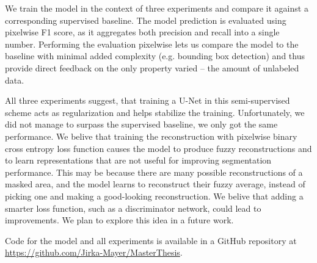 We train the model in the context of three experiments and compare it against a corresponding supervised baseline. The model prediction is evaluated using pixelwise F1 score, as it aggregates both precision and recall into a single number. Performing the evaluation pixelwise lets us compare the model to the baseline with minimal added complexity (e.g. bounding box detection) and thus provide direct feedback on the only property varied -- the amount of unlabeled data.

All three experiments suggest, that training a U-Net in this semi-supervised scheme acts as regularization and helps stabilize the training. Unfortunately, we did not manage to surpass the supervised baseline, we only got the same performance. We belive that training the reconstruction with pixelwise binary cross entropy loss function causes the model to produce fuzzy reconstructions and to learn representations that are not useful for improving segmentation performance. This may be because there are many possible reconstructions of a masked area, and the model learns to reconstruct their fuzzy average, instead of picking one and making a good-looking reconstruction. We belive that adding a smarter loss function, such as a discriminator network, could lead to improvements. We plan to explore this idea in a future work.

Code for the model and all experiments is available in a GitHub repository at \url{https://github.com/Jirka-Mayer/MasterThesis}.
